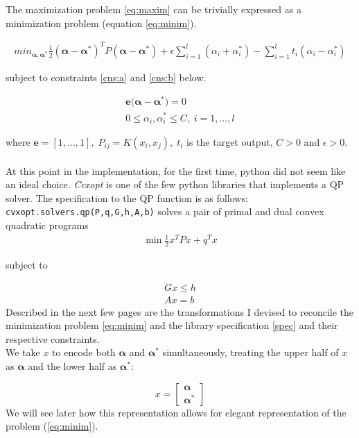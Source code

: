 \documentclass[11pt,twoside,notitlepage]{report}
\begin{document}
The maximization problem \ref{eq:maxim} can be
trivially expressed as a minimization problem (equation \ref{eq:minim}).

\begin{gather}\label{eq:minim} min_{\bm{\alpha},\bm{\alpha^*}}
  \frac{1}{2}(\bm{\alpha-\alpha^*})^T P (\bm{\alpha - \alpha^*})+\epsilon
  \sum_{i=1}^{l}(\alpha_i+\alpha_i^*)-\sum_{i=1}^{l}t_i(\alpha_i-\alpha_i^*)
\end{gather}

subject to constraints \ref{cns:a} and \ref{cns:b} below.

\begin{gather} \mathbf{e(\bm{\alpha}}-\bm{\alpha^*})=0 \label{cns:a}\\ 0\leq
  \alpha_i,\alpha_i^* \leq C, \;i=1,...,l \label{cns:b} \end{gather}

where \(\mathbf{e}=[1,...,1],\;P_{ij}=K(x_i,x_j),\;t_i\) is the target output,
\(C > 0\) and \(\epsilon > 0.\) \paragraph*{} At this point in the
implementation, for the first time, python did not seem like an ideal choice.
\textit{Cvxopt} is one of the few python libraries that implements a QP solver.
The specification to the QP function is as follows:
\texttt{cvxopt.solvers.qp(P,q,G,h,A,b)} solves a pair of primal and dual convex
quadratic programs \begin{gather} \label{spec} \min \frac{1}{2} x^T P x + q^T x
\end{gather}

 subject to

\begin{gather} G x \leq h\\ Ax = b \end{gather} Described in the next few pages
are the transformations I devised to reconcile the minimization problem
\ref{eq:minim} and the library specification \ref{spec} and their respective
constraints.\\ We take \(x\) to encode both \(\bm{\alpha}\) and
\(\bm{\alpha^*}\) simultaneously, treating the upper half of \(x\) as
\(\bm{\alpha}\) and the lower half as \(\bm{\alpha^*}\):


\[x =
  \begin{bmatrix}
    \bm{ \alpha} \\
    \bm{ \alpha^*}
  \end{bmatrix}
\]
We will see later how this representation allows for elegant representation of
the problem (\ref{eq:minim}).
\end{document}
